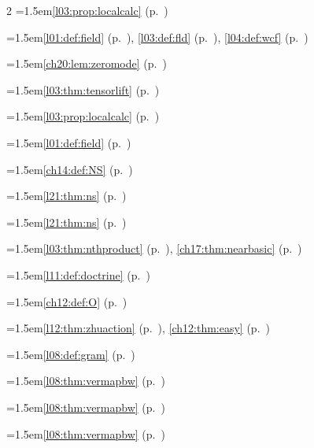 \begin{multicols}{2}
\hangindent=1.5em\quad \ref{l03:prop:localcalc} (p.~\pageref{l03:prop:localcalc})\par
\hangindent=1.5em\quad \ref{l01:def:field} (p.~\pageref{l01:def:field}), \ref{l03:def:fld} (p.~\pageref{l03:def:fld}), \ref{l04:def:wcf} (p.~\pageref{l04:def:wcf})\par
\hangindent=1.5em\quad \ref{ch20:lem:zeromode} (p.~\pageref{ch20:lem:zeromode})\par
\hangindent=1.5em\quad \ref{l03:thm:tensorlift} (p.~\pageref{l03:thm:tensorlift})\par
\hangindent=1.5em\quad \ref{l03:prop:localcalc} (p.~\pageref{l03:prop:localcalc})\par
\hangindent=1.5em\quad \ref{l01:def:field} (p.~\pageref{l01:def:field})\par
\hangindent=1.5em\quad \ref{ch14:def:NS} (p.~\pageref{ch14:def:NS})\par
\hangindent=1.5em\quad \ref{l21:thm:ns} (p.~\pageref{l21:thm:ns})\par
\hangindent=1.5em\quad \ref{l21:thm:ns} (p.~\pageref{l21:thm:ns})\par
\hangindent=1.5em\quad \ref{l03:thm:nthproduct} (p.~\pageref{l03:thm:nthproduct}), \ref{ch17:thm:nearbasic} (p.~\pageref{ch17:thm:nearbasic})\par
\hangindent=1.5em\quad \ref{l11:def:doctrine} (p.~\pageref{l11:def:doctrine})\par
\par{}\par\nopagebreak\smallskip
\hangindent=1.5em\quad \ref{ch12:def:O} (p.~\pageref{ch12:def:O})\par
\hangindent=1.5em\quad \ref{l12:thm:zhuaction} (p.~\pageref{l12:thm:zhuaction}), \ref{ch12:thm:easy} (p.~\pageref{ch12:thm:easy})\par
\hangindent=1.5em\quad \ref{l08:def:gram} (p.~\pageref{l08:def:gram})\par
\hangindent=1.5em\quad \ref{l08:thm:vermapbw} (p.~\pageref{l08:thm:vermapbw})\par
\hangindent=1.5em\quad \ref{l08:thm:vermapbw} (p.~\pageref{l08:thm:vermapbw})\par
\hangindent=1.5em\quad \ref{l08:thm:vermapbw} (p.~\pageref{l08:thm:vermapbw})\par

\end{multicols}
